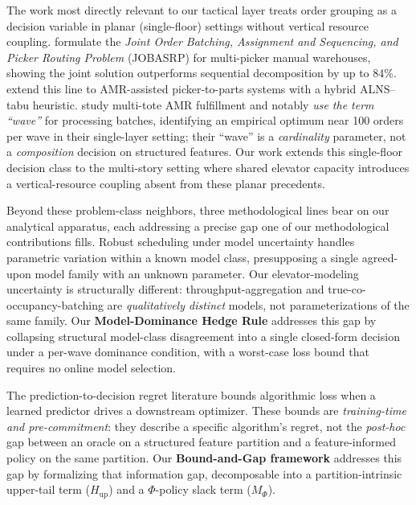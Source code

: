 \documentclass[11pt, a4paper]{article}
\begin{document}
The work most directly relevant to our tactical layer treats order grouping as a decision variable in planar (single-floor) settings without vertical resource coupling. \citet{scholz2017} formulate the \emph{Joint Order Batching, Assignment and Sequencing, and Picker Routing Problem} (JOBASRP) for multi-picker manual warehouses, showing the joint solution outperforms sequential decomposition by up to 84\%. \citet{zulj2022} extend this line to AMR-assisted picker-to-parts systems with a hybrid ALNS--tabu heuristic. \citet{qin2024} study multi-tote AMR fulfillment and notably \emph{use the term ``wave''} for processing batches, identifying an empirical optimum near 100 orders per wave in their single-layer setting; their ``wave'' is a \emph{cardinality} parameter, not a \emph{composition} decision on structured features. Our work extends this single-floor decision class to the multi-story setting where shared elevator capacity introduces a vertical-resource coupling absent from these planar precedents.

Beyond these problem-class neighbors, three methodological lines bear on our analytical apparatus, each addressing a precise gap one of our methodological contributions fills. Robust scheduling under model uncertainty \citep{wiesemann2013, lushen2021} handles parametric variation within a known model class, presupposing a single agreed-upon model family with an unknown parameter. Our elevator-modeling uncertainty is structurally different: throughput-aggregation and true-co-occupancy-batching are \emph{qualitatively distinct} models, not parameterizations of the same family. Our \textbf{Model-Dominance Hedge Rule} addresses this gap by collapsing structural model-class disagreement into a single closed-form decision under a per-wave dominance condition, with a worst-case loss bound that requires no online model selection.

The prediction-to-decision regret literature \citep{elmachtoub2022, vera2021} bounds algorithmic loss when a learned predictor drives a downstream optimizer. These bounds are \emph{training-time and pre-commitment}: they describe a specific algorithm's regret, not the \emph{post-hoc} gap between an oracle on a structured feature partition and a feature-informed policy on the same partition. Our \textbf{Bound-and-Gap framework} addresses this gap by formalizing that information gap, decomposable into a partition-intrinsic upper-tail term ($H_{\mathrm{up}}$) and a $\Phi$-policy slack term ($M_\Phi$).
\end{document}

